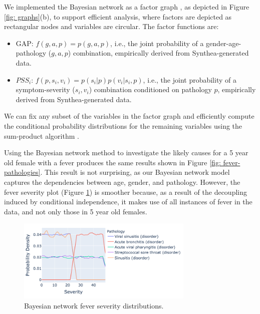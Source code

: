 \documentclass[11pt]{article}
\begin{document}
We implemented the Bayesian network as a factor graph \citep[pp. 399--402]{bishop2013pattern}, as depicted in Figure \ref{fig: graphs}(b), to support efficient analysis, where factors are depicted as rectangular nodes and variables are circular.  The factor functions are:
\begin{itemize}
  \item GAP: $f(g,a,p) = p(g,a,p)$, i.e., the joint probability of a gender-age-pathology ($g,a,p$) combination, empirically derived from Synthea-generated data.
  \item $PSS_{i}$: $f(p,s_{i},v_{i}) = p(s_{i}|p)p(v_{i}|s_{i},p)$, i.e., the joint probability of a symptom-severity ($s_{i},v_{i}$) combination conditioned on pathology $p$, empirically derived from Synthea-generated data.
\end{itemize}
We can fix any subset of the variables in the factor graph and efficiently compute the conditional probability distributions for the remaining variables using the sum-product algorithm \citep[pp.402--411]{bishop2013pattern}.  

Using the Bayesian network method to investigate the likely causes for a 5 year old female with a fever produces the same results shown in Figure \ref{fig: fever-pathologies}.  This result is not surprising, as our Bayesian network model captures the dependencies between age, gender, and pathology.  However, the fever severity plot (Figure \ref{fig: bayes-fever-severity}) is smoother because, as a result of the decoupling induced by conditional independence, it makes use of all instances of fever in the data, and not only those in 5 year old females.

\begin{figure}[!hbt]\centering
  \includegraphics[width=0.75\textwidth]{figures/bayes-fever-severity.png}
  \caption{Bayesian network fever severity distributions. \label{fig: bayes-fever-severity}}
\end{figure}

\end{document}
